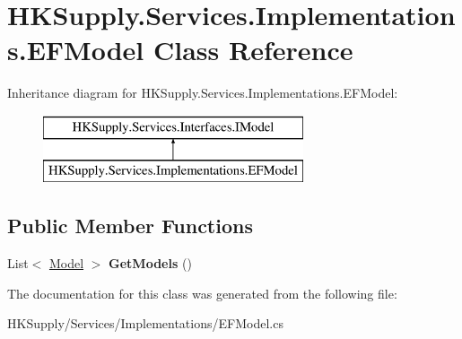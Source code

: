 \hypertarget{class_h_k_supply_1_1_services_1_1_implementations_1_1_e_f_model}{}\section{H\+K\+Supply.\+Services.\+Implementations.\+E\+F\+Model Class Reference}
\label{class_h_k_supply_1_1_services_1_1_implementations_1_1_e_f_model}
Inheritance diagram for H\+K\+Supply.\+Services.\+Implementations.\+E\+F\+Model\+:\begin{figure}[H]
\begin{center}
\leavevmode
\includegraphics[height=2.000000cm]{class_h_k_supply_1_1_services_1_1_implementations_1_1_e_f_model}
\end{center}
\end{figure}
\subsection*{Public Member Functions}
\begin{DoxyCompactItemize}
\item 
\mbox{\label{class_h_k_supply_1_1_services_1_1_implementations_1_1_e_f_model_ab94677b204ca440c9f7d4637c4d39330}} 
List$<$ \mbox{\hyperlink{class_h_k_supply_1_1_models_1_1_model}{Model}} $>$ {\bfseries Get\+Models} ()
\end{DoxyCompactItemize}


The documentation for this class was generated from the following file\+:\begin{DoxyCompactItemize}
\item 
H\+K\+Supply/\+Services/\+Implementations/E\+F\+Model.\+cs\end{DoxyCompactItemize}
